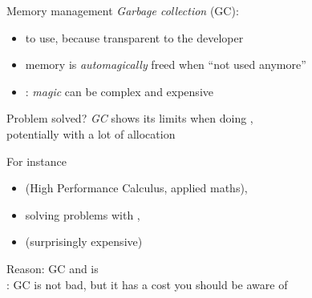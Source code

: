 \documentclass[10pt]{beamer}
\begin{document}
\begin{frame}{Memory management}
  \emph{Garbage collection} (GC):
  \begin{itemize}
    \item {} to use, because transparent to the developer
    \item memory is \emph{automagically} freed when ``not used anymore''
    \item<2-> : \emph{magic} can be complex and expensive
  \end{itemize}
  \bigskip{}
  \bigskip
\end{frame}




\begin{frame}{Problem solved?}
  \emph{GC} shows its limits when doing ,\\
  potentially with a lot of allocation
  \bigskip

  For instance
  \smallskip
  \begin{itemize}\bigsep
    \item {} \hfill (High Performance Calculus, applied maths),
    \item solving problems with ,
    \item {} \hfill (surprisingly expensive)
  \end{itemize}
  \bigskip

  Reason: GC  and is  \\
  : GC is not bad, but it has a cost you should be aware of
\end{frame}
\end{document}
